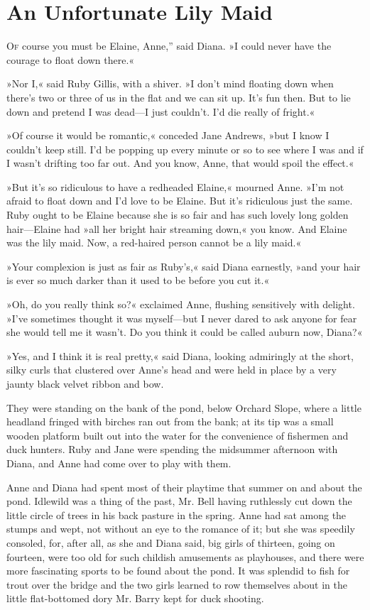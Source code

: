 \chapter{An Unfortunate Lily Maid}

\lettrine[ante=“,lines=4]{O}{f} course you must be Elaine, Anne,” said Diana. »I could never have the courage to float down there.«

»Nor I,« said Ruby Gillis, with a shiver. »I don’t mind floating down when there’s two or three of us in the flat and we can sit up. It’s fun then. But to lie down and pretend I was dead—I just couldn’t. I’d die really of fright.«

»Of course it would be romantic,« conceded Jane Andrews, »but I know I couldn’t keep still. I’d be popping up every minute or so to see where I was and if I wasn’t drifting too far out. And you know, Anne, that would spoil the effect.«

»But it’s so ridiculous to have a redheaded Elaine,« mourned Anne. »I’m not afraid to float down and I’d love to be Elaine. But it’s ridiculous just the same. Ruby ought to be Elaine because she is so fair and has such lovely long golden hair—Elaine had »all her bright hair streaming down,« you know. And Elaine was the lily maid. Now, a red-haired person cannot be a lily maid.«

»Your complexion is just as fair as Ruby’s,« said Diana earnestly, »and your hair is ever so much darker than it used to be before you cut it.«

»Oh, do you really think so?« exclaimed Anne, flushing sensitively with delight. »I’ve sometimes thought it was myself—but I never dared to ask anyone for fear she would tell me it wasn’t. Do you think it could be called auburn now, Diana?«

»Yes, and I think it is real pretty,« said Diana, looking admiringly at the short, silky curls that clustered over Anne’s head and were held in place by a very jaunty black velvet ribbon and bow.

They were standing on the bank of the pond, below Orchard Slope, where a little headland fringed with birches ran out from the bank; at its tip was a small wooden platform built out into the water for the convenience of fishermen and duck hunters. Ruby and Jane were spending the midsummer afternoon with Diana, and Anne had come over to play with them.

Anne and Diana had spent most of their playtime that summer on and about the pond. Idlewild was a thing of the past, Mr. Bell having ruthlessly cut down the little circle of trees in his back pasture in the spring. Anne had sat among the stumps and wept, not without an eye to the romance of it; but she was speedily consoled, for, after all, as she and Diana said, big girls of thirteen, going on fourteen, were too old for such childish amusements as playhouses, and there were more fascinating sports to be found about the pond. It was splendid to fish for trout over the bridge and the two girls learned to row themselves about in the little flat-bottomed dory Mr. Barry kept for duck shooting.

